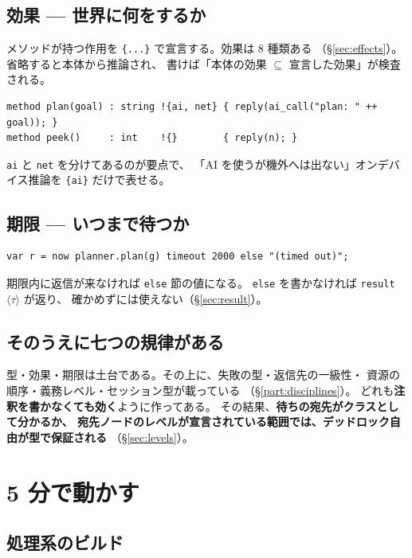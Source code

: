 \documentclass[11pt,a4paper]{ltjsarticle}
\newcommand{\eff}[1]{\texttt{\{#1\}}}
\begin{document}
\subsection{効果 --- 世界に何をするか}

メソッドが持つ作用を \eff{...} で宣言する。効果は 8 種類ある
（\S\ref{sec:effects}）。省略すると本体から推論され、
書けば「本体の効果 $\subseteq$ 宣言した効果」が検査される。

\begin{lstlisting}
method plan(goal) : string !{ai, net} { reply(ai_call("plan: " ++ goal)); }
method peek()     : int    !{}        { reply(n); }
\end{lstlisting}

\texttt{ai} と \texttt{net} を分けてあるのが要点で、
「AI を使うが機外へは出ない」オンデバイス推論を \eff{ai} だけで表せる。

\subsection{期限 --- いつまで待つか}

\begin{lstlisting}
var r = now planner.plan(g) timeout 2000 else "(timed out)";
\end{lstlisting}

期限内に返信が来なければ \texttt{else} 節の値になる。
\texttt{else} を書かなければ \texttt{result}$\langle\tau\rangle$ が返り、
確かめずには使えない（\S\ref{sec:result}）。

\subsection{そのうえに七つの規律がある}

型・効果・期限は土台である。その上に、失敗の型・返信先の一級性・
資源の順序・義務レベル・セッション型が載っている
（\S\ref{part:disciplines}）。
どれも\textbf{注釈を書かなくても効く}ように作ってある。
その結果、\textbf{待ちの宛先がクラスとして分かるか、
宛先ノードのレベルが宣言されている範囲では、デッドロック自由が型で保証される}
（\S\ref{sec:levels}）。

\section{5 分で動かす}

\subsection{処理系のビルド}
\end{document}
